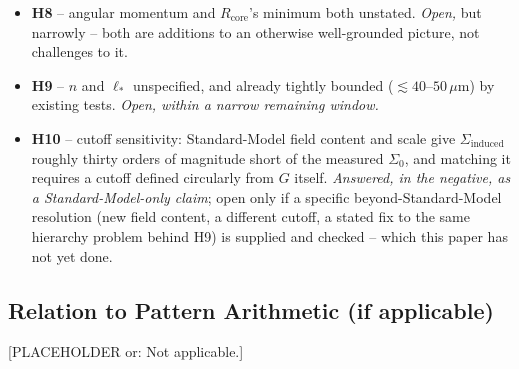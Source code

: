 \documentclass[12pt, a4paper]{article}
\begin{document}
\begin{itemize}
    present epoch, and no stated mechanism for net extraction.
    \emph{Answered} on extraction (dropped); magnitude gap is
    expected, not a flaw, given the mechanism.
  \item \textbf{H8} -- angular momentum and $R_{\mathrm{core}}$'s
    minimum both unstated. \emph{Open,} but narrowly -- both are
    additions to an otherwise well-grounded picture, not challenges
    to it.
  \item \textbf{H9} -- $n$ and $\ell_\ast$ unspecified, and already
    tightly bounded ($\lesssim40$--$50\,\mu\mathrm{m}$) by existing
    tests. \emph{Open, within a narrow remaining window.}
  \item \textbf{H10} -- cutoff sensitivity: Standard-Model field
    content and scale give $\Sigma_{\text{induced}}$ roughly thirty
    orders of magnitude short of the measured $\Sigma_0$, and matching
    it requires a cutoff defined circularly from $G$ itself.
    \emph{Answered, in the negative, as a Standard-Model-only claim};
    open only if a specific beyond-Standard-Model resolution (new
    field content, a different cutoff, a stated fix to the same
    hierarchy problem behind H9) is supplied and checked -- which this
    paper has not yet done.
\end{itemize}

\subsection{Relation to Pattern Arithmetic (if applicable)}
[PLACEHOLDER or: Not applicable.]

\end{document}
